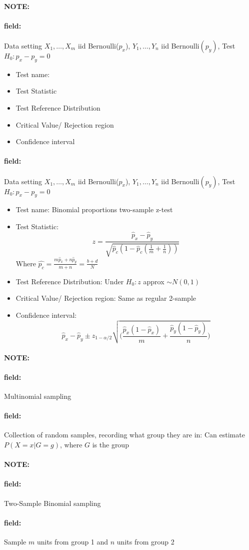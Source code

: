 \documentclass[12pt]{article}
\newenvironment{note}{\paragraph{NOTE:}}{}
\newenvironment{field}{\paragraph{field:}}{}
\begin{document}
\begin{note}
\begin{field}
  Data setting $X_1, \ldots , X_m$ iid Bernoulli($p_x$), $Y_1, \ldots, Y_n$ iid Bernoulli$(p_y)$, Test $H_0: p_x - p_y = 0$
  \begin{itemize}
    \item Test name:
    \item Test Statistic
    \item Test Reference Distribution
    \item Critical Value/ Rejection region
    \item Confidence interval
  \end{itemize}
\end{field}
\begin{field}
  Data setting $X_1, \ldots , X_m$ iid Bernoulli($p_x$), $Y_1, \ldots, Y_n$ iid Bernoulli$(p_y)$, Test $H_0: p_x - p_y = 0$
  \begin{itemize}
    \item Test name: Binomial proportions two-sample z-test
    \item Test Statistic: $$ z = \frac{\hat{p}_x - \hat{p}_y}{\sqrt{\hat{p}_c(1 - \hat{p}_c(\frac{1}{m} + \frac{1}{n}))}} $$ Where $\hat{p_c} = \frac{m\hat{p}_x + n\hat{p}_y}{m+n} = \frac{b + d}{N}$
    \item Test Reference Distribution: Under $H_0: z $ approx $\sim N(0,1)$
    \item Critical Value/ Rejection region: Same as regular 2-sample
    \item Confidence interval: $$  \hat{p}_x - \hat{p}_y \pm z_{1 - \alpha/2} \sqrt{\big(\frac{\hat{p}_x(1 - \hat{p}_x)}{m} + \frac{\hat{p}_y(1 - \hat{p}_y)}{n}\big)}$$
    \end{itemize}
\end{field}
\end{note}

\begin{note}
  \begin{field}
    Multinomial sampling
  \end{field}
  \begin{field}
    Collection of random samples, recording what group they are in: Can estimate $P(X = x | G = g)$, where $G$ is the group
  \end{field}
\end{note}


\begin{note}
  \begin{field}
    Two-Sample Binomial sampling
  \end{field}
  \begin{field}
     Sample $m$ units from group 1 and $n $ units from group 2
  \end{field}
\end{note}
\end{document}
